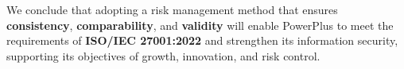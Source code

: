 \vspace{.7cm}
We conclude that adopting a risk management method that ensures \textbf{consistency}, \textbf{comparability}, and \textbf{validity} will enable PowerPlus to meet the requirements of \textbf{ISO/IEC 27001:2022} and strengthen its information security, supporting its objectives of growth, innovation, and risk control.


